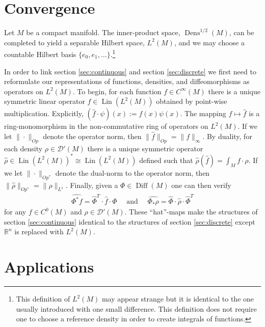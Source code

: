 \documentclass[12pt]{amsart}
\newcommand{\R}{\ensuremath{\mathbb{R}}}
\DeclareMathOperator{\Diff}{Diff}
\DeclareMathOperator{\Dens}{Dens}
\DeclareMathOperator{\Lin}{Lin}
\DeclareMathOperator{\Tr}{Tr}
\begin{document}
\section{Convergence}
\label{sec:convergence}
Let $M$ be a compact manifold.
The inner-product space, $\Dens^{1/2}(M)$, can be completed to yield a separable Hilbert space, $L^2(M)$,
and we may choose a countable Hilbert basis $\{e_0,e_1,\dots\}$.\footnote{This definition of $L^2(M)$ may appear strange but it is identical to the one usually introduced with one small difference.
This definition does not require one to choose a reference density in order to create integrals of functions.}

In order to link section \ref{sec:continuous} and section \ref{sec:discrete}
we first need to reformulate our representations of functions, densities, and diffeomorphisms as operators on $L^2(M)$.
To begin, for each function $f \in C^\infty(M)$ there is a unique symmetric linear operator $\hat{f} \in \Lin( L^2(M) )$
obtained by point-wise multiplication.  Explicitly, $(\hat{f} \cdot \psi)(x) := f(x) \psi(x)$.
The mapping $f \mapsto \hat{f}$ is a ring-monomorphism in the non-commutative ring of operators on $L^2(M)$.
If we let $\| \cdot \|_{Op}$ denote the operator norm, then $\| \hat{f} \|_{Op} = \| f \|_{\infty}$.
By duality, for each density $\rho \in \mathcal{D}'(M)$ there is a unique symmetric operator $\hat{\rho} \in \Lin(L^2(M))^* \cong \Lin(L^2(M))$ defined
such that $ \hat{\rho} (\hat{f}) = \int_M f \cdot \rho $.
If we let $\| \cdot \|_{Op^*}$ denote the dual-norm to the operator norm, then $\| \hat{\rho} \|_{Op^*} = \| \rho \|_{L^1}$.
Finally, given a $\Phi \in \Diff(M)$ one can then verify
\begin{align*}
	\widehat{\Phi^* f} = \widehat{\Phi}^T \cdot \hat{f} \cdot \widehat{\Phi} \quad \text{ and } \quad
	\widehat{\Phi_* \rho} = \widehat{\Phi} \cdot \hat{\rho} \cdot \widehat{\Phi}^T
\end{align*}
for any $f \in C^0(M)$ and $\rho \in \mathcal{D}'(M)$.
These ``hat''-maps make the structures of section \ref{sec:continuous} identical to the structures of section \ref{sec:discrete}
except $\R^n$ is replaced with $L^2(M)$.

\section{Applications}
\end{document}
